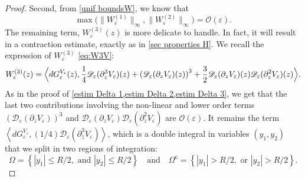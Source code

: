 \documentclass[10pt]{amsart}
\let\mathcal\mathscr
\newcommand{\cO}{\mathcal{O}}
\theoremstyle{plain}
\theoremstyle{definition}
\newcommand{\comega}{\Omega^{\mathsf{c}}}
\newcommand{\D}{\mathcal{D}_\eps}
\let\eps\varepsilon
\newcommand{\abs}[1]{\left\lvert#1\right\rvert}
\newcommand{\dQVe}{dG_\eps^{V_\eps}}
\begin{document}
\begin{proof}
Second, from \cref{unif boundsW}, we know that
\begin{equation*}
\max\bigl (\bigl \| W_\eps^{(1)} \bigr \|_{\infty}, \bigl \| W_\eps^{(2)} \bigr \|_{\infty} \bigr)= \cO(\eps).
\end{equation*}
The remaining term, $W_\eps^{(3)}(z)$ is more delicate to handle. In fact, it will result in a contraction estimate, exactly as in \cref{sec properties H}. We recall the expression of $W_\eps^{(3)} $ \eqref{eq:W3V}:
\begin{equation*}
W_\eps^{(3)}(z) =
\Bigl\langle \dQVe(z), \dfrac{1}{4} \D(\partial_z^3 V_\eps)(z) + \left(\D(\partial_z V_\eps)(z)\right)^3
+ \frac32 \D(\partial_z V_\eps)(z) \D(\partial_z^2 V_\eps)(z) \Bigr\rangle.
\end{equation*}
As in the proof of \cref{estim Delta 1,estim Delta 2,estim Delta 3}, we get that the last two contributions involving the non-linear and lower order terms $\left(\D(\partial_z V_\eps) \right)^3$ and
$ \D(\partial_z V_\eps) \D(\partial_z^2 V_\eps)$ are $\cO(\eps)$.
It remains the term $\left\langle \dQVe, (1/4) \D(\partial_z^3 V_\eps) \right \rangle$, which is a double integral in variables $(y_1,y_2)$ that we split in two regions of integration: $$\Omega = \left\{ \abs{y_1} \leq R/2, \text{ and } \abs{y_2} \leq R/2 \right\}\quad\text{and}\quad \comega= \left\{ \abs{y_1} > R/2, \text{ or } \abs{y_2} > R/2 \right\}.$$


\end{proof}
\end{document}
